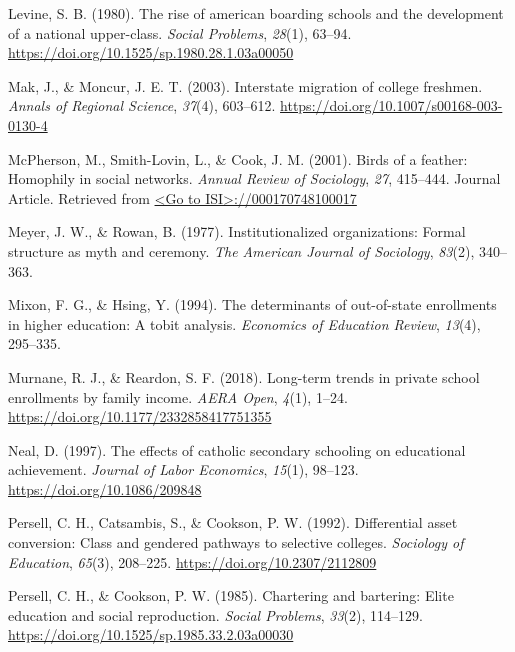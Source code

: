 \documentclass[
  12pt,
]{article}
\newlength{\cslhangindent}
\newlength{\cslentryspacingunit} %
\newenvironment{CSLReferences}[2] %
 {%
  \setlength{\parindent}{0pt}
  \ifodd #1
  \let\oldpar\par
  \def\par{\hangindent=\cslhangindent\oldpar}
  \fi
  \setlength{\parskip}{#2\cslentryspacingunit}
 }%
 {}
\begin{document}
\begin{CSLReferences}{1}{0}
\leavevmode{}%
Levine, S. B. (1980). The rise of american boarding schools and the development of a national upper-class. \emph{Social Problems}, \emph{28}(1), 63--94. \url{https://doi.org/10.1525/sp.1980.28.1.03a00050}

\leavevmode{}%
Mak, J., \& Moncur, J. E. T. (2003). Interstate migration of college freshmen. \emph{Annals of Regional Science}, \emph{37}(4), 603--612. \url{https://doi.org/10.1007/s00168-003-0130-4}

\leavevmode{}%
McPherson, M., Smith-Lovin, L., \& Cook, J. M. (2001). Birds of a feather: Homophily in social networks. \emph{Annual Review of Sociology}, \emph{27}, 415--444. Journal Article. Retrieved from \href{\%3CGo\%20to\%20ISI\%3E://000170748100017}{\textless Go to ISI\textgreater://000170748100017}

\leavevmode{}%
Meyer, J. W., \& Rowan, B. (1977). Institutionalized organizations: Formal structure as myth and ceremony. \emph{The American Journal of Sociology}, \emph{83}(2), 340--363.

\leavevmode{}%
Mixon, F. G., \& Hsing, Y. (1994). The determinants of out-of-state enrollments in higher education: A tobit analysis. \emph{Economics of Education Review}, \emph{13}(4), 295--335.

\leavevmode{}%
Murnane, R. J., \& Reardon, S. F. (2018). Long-term trends in private school enrollments by family income. \emph{AERA Open}, \emph{4}(1), 1--24. \url{https://doi.org/10.1177/2332858417751355}

\leavevmode{}%
Neal, D. (1997). The effects of catholic secondary schooling on educational achievement. \emph{Journal of Labor Economics}, \emph{15}(1), 98--123. \url{https://doi.org/10.1086/209848}

\leavevmode{}%
Persell, C. H., Catsambis, S., \& Cookson, P. W. (1992). Differential asset conversion: Class and gendered pathways to selective colleges. \emph{Sociology of Education}, \emph{65}(3), 208--225. \url{https://doi.org/10.2307/2112809}

\leavevmode{}%
Persell, C. H., \& Cookson, P. W. (1985). Chartering and bartering: Elite education and social reproduction. \emph{Social Problems}, \emph{33}(2), 114--129. \url{https://doi.org/10.1525/sp.1985.33.2.03a00030}


\end{CSLReferences}
\end{document}
